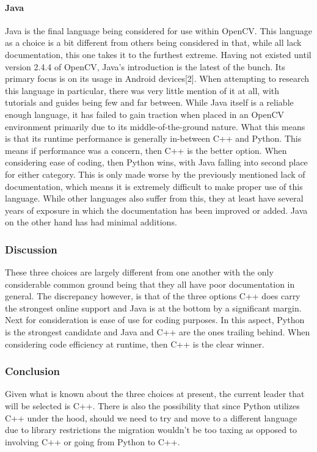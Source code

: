 \documentclass[article, onecolumn, draftclsnofoot,10pt, compsoc]{IEEEtran}
\begin{document}
\paragraph{Java}
Java is the final language being considered for use within OpenCV. This language as a choice is a bit different from others being considered in that, while all lack documentation, this one takes it to the furthest extreme. Having not existed until version 2.4.4 of OpenCV, Java’s introduction is the latest of the bunch. Its primary focus is on its usage in Android devices[2]. When attempting to research this language in particular, there was very little mention of it at all, with tutorials and guides being few and far between. While Java itself is a reliable enough language, it has failed to gain traction when placed in an OpenCV environment primarily due to its middle-of-the-ground nature. What this means is that its runtime performance is generally in-between C++ and Python. This means if performance was a concern, then C++ is the better option. When considering ease of coding, then Python wins, with Java falling into second place for either category. This is only made worse by the previously mentioned lack of documentation, which means it is extremely difficult to make proper use of this language. While other languages also suffer from this, they at least have several years of exposure in which the documentation has been improved or added. Java on the other hand has had minimal additions.

\subsubsection{Discussion}
These three choices are largely different from one another with the only considerable common ground being that they all have poor documentation in general. The discrepancy however, is that of the three options C++ does carry the strongest online support and Java is at the bottom by a significant margin. Next for consideration is ease of use for coding purposes. In this aspect, Python is the strongest candidate and Java and C++ are the ones trailing behind. When considering code efficiency at runtime, then C++ is the clear winner.

\subsubsection{Conclusion}
Given what is known about the three choices at present, the current leader that will be selected is C++. There is also the possibility that since Python utilizes C++ under the hood, should we need to try and move to a different language due to library restrictions the migration wouldn’t be too taxing as opposed to involving C++ or going from Python to C++. 
\end{document}
